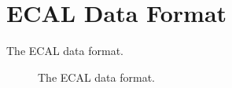 
\section{ECAL Data Format}\label{sec:ECAL}

The ECAL data format.

\begin{figure}[htp]
\begin{center}
  \caption{The ECAL data format.}
  \label{fig:ECAL}
 \end{center}
\end{figure}

